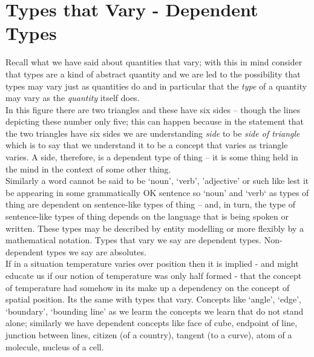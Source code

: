 \documentclass[12pt,a4paper]{article}
\begin{document}
\section{Types that Vary - Dependent Types}
 Recall what we have said about quantities that vary; with this in mind consider that types are a kind of abstract quantity and we are led to the possibility that types
may vary just as quantities do and in particular that the \textit{type} of a quantity may vary as the \textit{quantity} itself  does.  \\

\noindent In this figure
\raisebox{-0.5cm}{
\pspicture(0,-0.1)(1.1,1)
\psline(0,0)(0,1)(1,1)(1,0)(0,0)
\psline (0,0)(1,1)
\endpspicture
}
there are two triangles and these have six sides -- though the lines depicting these number only five; 
this can happen
because in the statement that the two triangles have six sides we are understanding \textit{side}
to be \textit{side of triangle} which is to say that we understand it to be a concept that varies as
triangle varies. A side, therefore, is a dependent type of thing -- it is some thing held in the mind
in the context of some other thing. \\


\noindent
Similarly a word cannot be said to be `noun', `verb', 'adjective' or such like lest it be appearing in some grammatically OK sentence so `noun' and `verb` as types of thing are dependent on sentence-like types of thing 
-- and, in turn, the type of sentence-like types of thing depends on the language that is being spoken or written.
 These types may be described by entity modelling or more flexibly by a mathematical notation. Types
that vary we say are dependent types. Non-dependent types we say are absolutes. \\

\noindent If in a situation temperature varies over position then it is implied - and might educate us if our notion of temperature was only half formed - that the concept of temperature had somehow in its make up a dependency on the concept of spatial position. Its the same with types that vary. 
Concepts like `angle', `edge', `boundary', `bounding line' as we learm the concepts
we learn that do not stand alone; similarly
we have dependent concepts like  face of cube,  endpoint of line,   junction between lines, citizen (of a country), tangent (to a curve), atom of a molecule,  nucleus of a cell. \\
\end{document}
